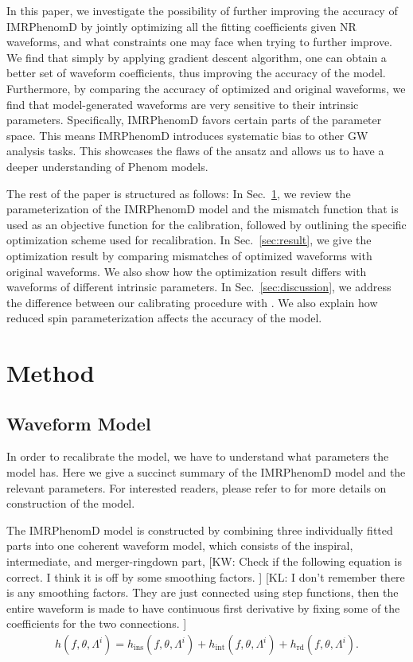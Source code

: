 \documentclass[twocolumn]{aastex631}
\newcommand{\kw}[1]{{\color{rb4}[KW: #1 ]}}
\newcommand{\kl}[1]{{\color{cyan}[KL: #1 ]}}
\begin{document}
In this paper, we investigate the possibility of further improving the accuracy
of IMRPhenomD by jointly optimizing all the fitting coefficients given NR
waveforms, and what constraints one may face when trying to further improve. We
find that simply by applying gradient descent algorithm, one can obtain a better
set of waveform coefficients, thus improving the accuracy of the model.
Furthermore, by comparing the accuracy of optimized and original waveforms, we
find that model-generated waveforms are very sensitive to their intrinsic
parameters. Specifically, IMRPhenomD favors certain parts of the parameter
space. This means IMRPhenomD introduces systematic bias to other GW analysis
tasks. This showcases the flaws of the ansatz and allows us to have a deeper
understanding of Phenom models.  

The rest of the paper is structured as follows: In Sec.~\ref{sec:method}, we
review the parameterization of the IMRPhenomD model and the mismatch function
that is used as an objective function for the calibration, followed by outlining the
specific optimization scheme used for recalibration. In
Sec.~\ref{sec:result}, we give the optimization result by comparing mismatches
of optimized waveforms with original waveforms. We also show how the
optimization result differs with waveforms of different intrinsic parameters. In
Sec.~\ref{sec:discussion}, we address the difference between our calibrating
procedure with \citep{khan2016frequency}. We also explain how reduced spin
parameterization affects the accuracy of the model. 

\section{Method} \label{sec:method}

\subsection{Waveform Model} \label{subsec:waveform_model}

In order to recalibrate the model, we have to understand what parameters the model has.
Here we give a succinct summary of the IMRPhenomD model and the relevant parameters.
For interested readers, please refer to \citep{khan2016frequency} for more details on construction of the model.


The IMRPhenomD model is constructed by combining three individually fitted parts
into one coherent waveform model, which consists of the inspiral, intermediate, and merger-ringdown part, 
\kw{Check if the following equation is correct. I think it is off by some smoothing factors.} 
\kl{I don't remember there is any smoothing factors. They are just connected using step functions, then the entire waveform is made to have continuous first derivative by fixing some of the coefficients for the two connections.}
\begin{align}\label{eq:joint_waveform}
	h(f,\theta,\Lambda^i)=h_{\mathrm{ins}}(f,\theta,\Lambda^i) + h_{\mathrm{int}}(f,\theta,\Lambda^i) + h_{\mathrm{rd}}(f,\theta,\Lambda^i).
\end{align}
\end{document}
